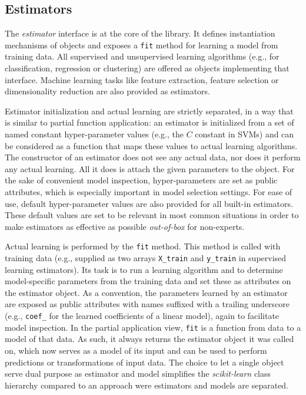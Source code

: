 \documentclass{llncs}
\newcommand{\sklearn}{\textit{scikit-learn}\xspace}
\begin{document}
\subsection{Estimators}
\label{sec:estimators}

The \textit{estimator} interface is at the core of the
library. It defines instantiation mechanisms of objects and exposes a
\texttt{fit} method for learning a model from training data.  All supervised and
unsupervised learning algorithms (e.g., for classification, regression or
clustering) are offered as objects implementing that interface. Machine
learning tasks like feature extraction, feature selection or dimensionality
reduction are also provided as estimators.

Estimator initialization and actual learning are strictly separated,
in a way that is similar to partial function application:
an estimator is initialized from a set of named constant hyper-parameter values
(e.g., the $C$ constant in SVMs)
and can be considered as a function
that maps these values to actual learning algorithms.
The constructor of an estimator does not see any actual data, nor does it perform any actual learning.
All it does is attach the given parameters to the object.
For the sake of convenient model inspection, hyper-parameters are set as public attributes,
which is especially important in model selection settings.
For ease of use, default hyper-parameter values are also provided
for all built-in estimators.
These default values are set to be relevant in most common
situations in order to make estimators as effective as possible
\textit{out-of-box} for non-experts.

Actual learning is performed by the \texttt{fit} method. This method is called
with training data (e.g., supplied as two arrays \texttt{X\_train} and
\texttt{y\_train} in supervised learning estimators). Its task is to run a
learning algorithm and to determine model-specific parameters from the training
data and set these as attributes on the estimator object. As a convention, the
parameters learned by an estimator are exposed as public attributes with names
suffixed with a trailing underscore (e.g., \texttt{coef\_} for the
learned coefficients of a linear model),
again to facilitate model inspection.
In the partial application view,
\texttt{fit} is a function from data to a model of that data.
As such, it always returns the estimator object it was called on,
which now serves as a model of its input and can be used to perform predictions or transformations of input data.
The choice to let a single object serve dual purpose as estimator and model
simplifies the \sklearn class hierarchy
compared to an approach were estimators and models are separated.
\end{document}
